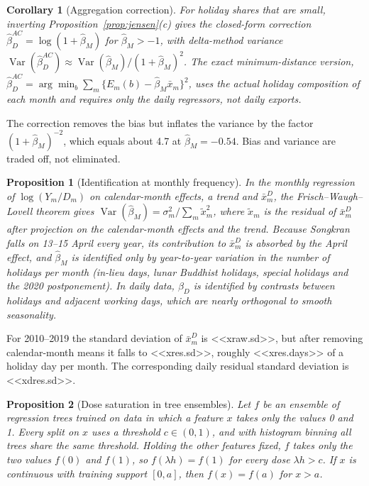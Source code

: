 \documentclass{article}
\theoremstyle{plain}
\newtheorem{proposition}{Proposition}
\newtheorem{corollary}{Corollary}
\theoremstyle{definition}
\theoremstyle{remark}
\begin{document}
\begin{corollary}[Aggregation correction]\label{cor:ac}
For holiday shares that are small, inverting Proposition~\ref{prop:jensen}(c) gives the closed-form correction $\hat\beta_D^{AC}=\log(1+\hat\beta_M)$ for $\hat\beta_M>-1$, with delta-method variance $\operatorname{Var}(\hat\beta_D^{AC})\approx\operatorname{Var}(\hat\beta_M)/(1+\hat\beta_M)^2$. The exact minimum-distance version, $\hat\beta_D^{AC}=\arg\min_b\sum_m\{E_m(b)-\hat\beta_M\bar x_m\}^2$, uses the actual holiday composition of each month and requires only the daily regressors, not daily exports.
\end{corollary}

The correction removes the bias but inflates the variance by the factor $(1+\hat\beta_M)^{-2}$, which equals about 4.7 at $\hat\beta_M=-0.54$. Bias and variance are traded off, not eliminated.

\begin{proposition}[Identification at monthly frequency]\label{prop:ident}
In the monthly regression of $\log(Y_m/D_m)$ on calendar-month effects, a trend and $\bar x^D_m$, the Frisch--Waugh--Lovell theorem gives $\operatorname{Var}(\hat\beta_M)=\sigma_m^2/\sum_m\tilde x_m^2$, where $\tilde x_m$ is the residual of $\bar x^D_m$ after projection on the calendar-month effects and the trend. Because Songkran falls on 13--15 April every year, its contribution to $\bar x^D_m$ is absorbed by the April effect, and $\hat\beta_M$ is identified only by year-to-year variation in the number of holidays per month (in-lieu days, lunar Buddhist holidays, special holidays and the 2020 postponement). In daily data, $\beta_D$ is identified by contrasts between holidays and adjacent working days, which are nearly orthogonal to smooth seasonality.
\end{proposition}

For 2010--2019 the standard deviation of $\bar x^D_m$ is <<xraw.sd>>, but after removing calendar-month means it falls to <<xres.sd>>, roughly <<xres.days>> of a holiday day per month. The corresponding daily residual standard deviation is <<xdres.sd>>.

\begin{proposition}[Dose saturation in tree ensembles]\label{prop:tree}
Let $f$ be an ensemble of regression trees trained on data in which a feature $x$ takes only the values 0 and 1. Every split on $x$ uses a threshold $c\in(0,1)$, and with histogram binning all trees share the same threshold. Holding the other features fixed, $f$ takes only the two values $f(0)$ and $f(1)$, so $f(\lambda h)=f(1)$ for every dose $\lambda h>c$. If $x$ is continuous with training support $[0,a]$, then $f(x)=f(a)$ for $x>a$.
\end{proposition}
\end{document}
